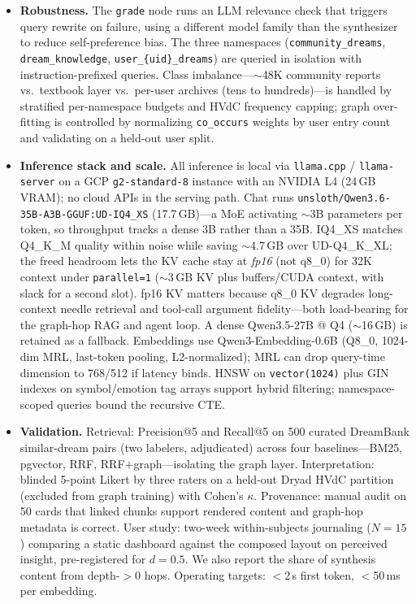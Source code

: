 \documentclass[paper=a4, fontsize=11pt]{scrartcl}
\begin{document}
\begin{itemize}
  \item \textbf{Robustness.} The \texttt{grade} node runs an LLM relevance
  check that triggers query rewrite on failure, using a different model
  family than the synthesizer to reduce self-preference bias. The three
  namespaces (\texttt{community\_dreams}, \texttt{dream\_knowledge},
  \texttt{user\_\{uid\}\_dreams}) are queried in isolation with
  instruction-prefixed queries. Class imbalance---$\sim$48K community
  reports vs.\ textbook layer vs.\ per-user archives (tens to
  hundreds)---is handled by stratified per-namespace budgets and HVdC
  frequency capping; graph over-fitting is controlled by normalizing
  \texttt{co\_occurs} weights by user entry count and validating on a
  held-out user split.

  \item \textbf{Inference stack and scale.} All inference is local via
  \texttt{llama.cpp} / \texttt{llama-server} on a GCP
  \texttt{g2-standard-8} instance with an NVIDIA L4 (24\,GB VRAM); no cloud
  APIs in the serving path. Chat runs
  \texttt{unsloth/Qwen3.6-35B-A3B-GGUF:UD-IQ4\_XS} (17.7\,GB)---a MoE
  activating $\sim$3B parameters per token, so throughput tracks a dense
  3B rather than a 35B. IQ4\_XS matches Q4\_K\_M quality within noise
  while saving $\sim$4.7\,GB over UD-Q4\_K\_XL; the freed headroom lets
  the KV cache stay at \emph{fp16} (not q8\_0) for 32K context under
  \texttt{parallel=1} ($\sim$3\,GB KV plus buffers/CUDA context, with
  slack for a second slot). fp16 KV matters because q8\_0 KV degrades
  long-context needle retrieval and tool-call argument fidelity---both
  load-bearing for the graph-hop RAG and agent loop. A dense Qwen3.5-27B
  @ Q4 ($\sim$16\,GB) is retained as a fallback. Embeddings use
  Qwen3-Embedding-0.6B (Q8\_0, 1024-dim MRL, last-token pooling,
  L2-normalized); MRL can drop query-time dimension to 768/512 if latency
  binds. HNSW on \texttt{vector(1024)} plus GIN indexes on symbol/emotion
  tag arrays support hybrid filtering; namespace-scoped queries bound
  the recursive CTE.

  \item \textbf{Validation.} Retrieval: Precision@5 and Recall@5 on 500
  curated DreamBank similar-dream pairs (two labelers, adjudicated) across
  four baselines---BM25, pgvector, RRF, RRF$+$graph---isolating the graph
  layer. Interpretation: blinded 5-point Likert by three raters on a
  held-out Dryad HVdC partition (excluded from graph training) with
  Cohen's $\kappa$. Provenance: manual audit on 50 cards that linked
  chunks support rendered content and graph-hop metadata is correct. User
  study: two-week within-subjects journaling ($N{=}15$) comparing a static
  dashboard against the composed layout on perceived insight,
  pre-registered for $d{=}0.5$. We also report the share of synthesis
  content from depth-$>$0 hops. Operating targets: $<$2\,s first token,
  $<$50\,ms per embedding.


\end{itemize}
\end{document}
